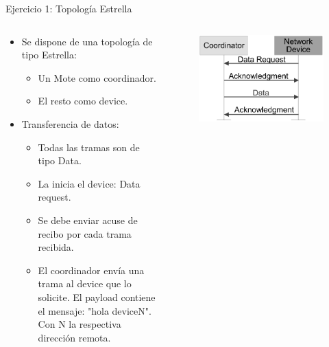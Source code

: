 \documentclass[aspectratio=169, handout]{beamer}
\begin{document}
\begin{frame}[t]{Ejercicio 1: Topología Estrella}
\begin{columns}[t]
    \begin{column}{.5\textwidth}
        \begin{minipage}[t][0.7\textheight][s]{\columnwidth}
            \begin{itemize}
            \item Se dispone de una topología de tipo Estrella:
            \begin{itemize}
                \item Un Mote como coordinador.
                \item El resto como device.
            \end{itemize}
            \vspace{5px}
            \item Transferencia de datos:
            \begin{itemize}
                \item Todas las tramas son de tipo Data.
                \item La inicia el device: Data request.
                \item Se debe enviar acuse de recibo por cada trama recibida.
                \item El coordinador envía una trama al device que lo solicite. El payload contiene el mensaje: "hola deviceN". Con N la respectiva dirección remota.
            \end{itemize}
        \end{itemize}
        \end{minipage}
    \end{column}
    \begin{column}{.5\textwidth}
        \begin{minipage}[t][0.7\textheight][s]{\columnwidth}
            \begin{figure}[H]
                \includegraphics[height=.5\textheight]{./imagenes/coord-dev-sinbeacon.jpg}

\end{figure}
\end{minipage}
\end{column}
\end{columns}
\end{frame}
\end{document}
